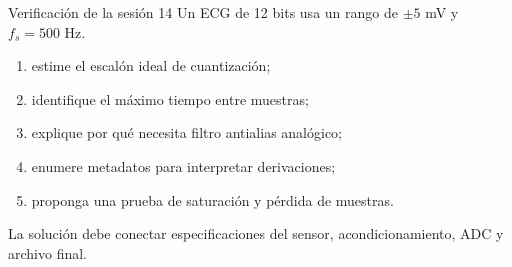 \documentclass[
  ignorenonframetext,
  aspectratio=169,
  spanish,
]{beamer}
\providecommand{\tightlist}{%
  \setlength{\itemsep}{0pt}\setlength{\parskip}{0pt}}
\begin{document}
\begin{frame}{Verificación de la sesión 14}
  \protect{}\label{verificaciuxf3n-de-la-sesiuxf3n-14}
  Un ECG de 12 bits usa un rango de \(\pm 5\) mV y \(f_s=500\) Hz.

  \begin{enumerate}
    \tightlist
    \item
          estime el escalón ideal de cuantización;
    \item
          identifique el máximo tiempo entre muestras;
    \item
          explique por qué necesita filtro antialias analógico;
    \item
          enumere metadatos para interpretar derivaciones;
    \item
          proponga una prueba de saturación y pérdida de muestras.
  \end{enumerate}

  \begin{tcolorbox}[enhanced jigsaw, arc=.35mm, bottomrule=.15mm, bottomtitle=1mm, breakable, colback=white, colbacktitle=quarto-callout-tip-color!10!white, colframe=quarto-callout-tip-color-frame, coltitle=black, left=2mm, leftrule=.75mm, opacityback=0, opacitybacktitle=0.6, rightrule=.15mm, title=\textcolor{quarto-callout-tip-color}{\faLightbulb}\hspace{0.5em}{Criterio de logro}, titlerule=0mm, toprule=.15mm, toptitle=1mm]

    La solución debe conectar especificaciones del sensor,
    acondicionamiento, ADC y archivo final.

  \end{tcolorbox}
\end{frame}
\end{document}
